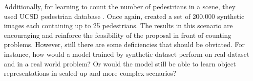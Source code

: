 Additionally, for learning to count the number of pedestrians in a scene, they used UCSD pedestrian database \cite{chan2008privacy}. Once again, \citealt*{segui2015learning} created a set of 200.000 synthetic images each containing up to 25 pedestrians. The results in this scenario are encouraging and reinforce the feasibility of the proposal in front of counting problems. However, still there are some deficiencies that should be obviated. For instance, how would a model trained by synthetic dataset perform on real dataset and in a real world problem? Or would the model still be able to learn object representations in scaled-up and more complex scenarios?





